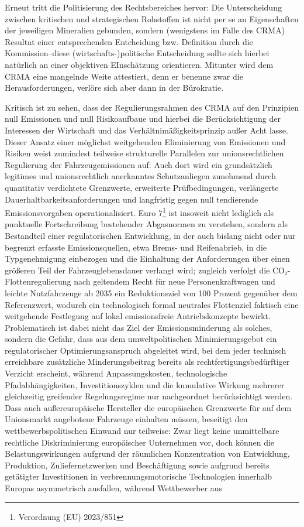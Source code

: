 \documentclass[12pt,a4paper,oneside]{book} %
\begin{document}
Erneut tritt die Politisierung des Rechtsbereiches hervor: Die Unterscheidung zwischen kritischen und strategischen Rohstoffen ist nicht per se an Eigenschaften der jeweiligen Mineralien gebunden, sondern (wenigstens im Falle des CRMA) Resultat einer entsprechenden Entcheidung bzw. Definition durch die Kommission--diese (wirtschafts-)politische Entscheidung sollte sich hierbei natürlich an einer objektiven EInschätzung orientieren.\autocite{Frau 2024, NVwZ, 1874, 1876} Mitunter wird dem CRMA eine mangelnde Weite attestiert, denn er benenne zwar die Herausforderungen, verlöre sich aber dann in der Bürokratie.\autocite{Lunday Politico}

Kritisch ist zu sehen, dass der Regulierungsrahmen des CRMA auf den Prinzipien \glqq null Emissionen und null Risiko\grqq aufbaue und hierbei die Berücksichtigung der Interessen der Wirtschaft und das Verhältnimäßigkeitsprinzip außer Acht lasse.\autocite{Frenz 2025, S. 1100} Dieser Ansatz einer möglichst weitgehenden Eliminierung von Emissionen und Risiken weist zumindest teilweise strukturelle Parallelen zur unionsrechtlichen Regulierung der Fahrzeugemissionen auf: Auch dort wird ein grundsätzlich legitimes und unionsrechtlich anerkanntes Schutzanliegen zunehmend durch quantitativ verdichtete Grenzwerte, erweiterte Prüfbedingungen, verlängerte Dauerhaltbarkeitsanforderungen und langfristig gegen null tendierende Emissionsvorgaben operationalisiert. Euro 7\footnote{Verordnung (EU) 2023/851} ist insoweit nicht lediglich als punktuelle Fortschreibung bestehender Abgasnormen zu verstehen, sondern als Bestandteil einer regulatorischen Entwicklung, in der auch bislang nicht oder nur begrenzt erfasste Emissionsquellen, etwa Brems- und Reifenabrieb, in die Typgenehmigung einbezogen und die Einhaltung der Anforderungen über einen größeren Teil der Fahrzeuglebensdauer verlangt wird; zugleich verfolgt die CO₂-Flottenregulierung nach geltendem Recht für neue Personenkraftwagen und leichte Nutzfahrzeuge ab 2035 ein Reduktionsziel von 100 Prozent gegenüber dem Referenzwert, wodurch ein technologisch formal neutrales Flottenziel faktisch eine weitgehende Festlegung auf lokal emissionsfreie Antriebskonzepte bewirkt. Problematisch ist dabei nicht das Ziel der Emissionsminderung als solches, sondern die Gefahr, dass aus dem umweltpolitischen Minimierungsgebot ein regulatorischer Optimierungsanspruch abgeleitet wird, bei dem jeder technisch erreichbare zusätzliche Minderungsbeitrag bereits als rechtfertigungsbedürftiger Verzicht erscheint, während Anpassungskosten, technologische Pfadabhängigkeiten, Investitionszyklen und die kumulative Wirkung mehrerer gleichzeitig greifender Regelungsregime nur nachgeordnet berücksichtigt werden. Dass auch außereuropäische Hersteller die europäischen Grenzwerte für auf dem Unionsmarkt angebotene Fahrzeuge einhalten müssen, beseitigt den wettbewerbspolitischen Einwand nur teilweise: Zwar liegt keine unmittelbare rechtliche Diskriminierung europäischer Unternehmen vor, doch können die Belastungswirkungen aufgrund der räumlichen Konzentration von Entwicklung, Produktion, Zuliefernetzwerken und Beschäftigung sowie aufgrund bereits getätigter Investitionen in verbrennungsmotorische Technologien innerhalb Europas asymmetrisch ausfallen, während Wettbewerber aus 
\end{document}
